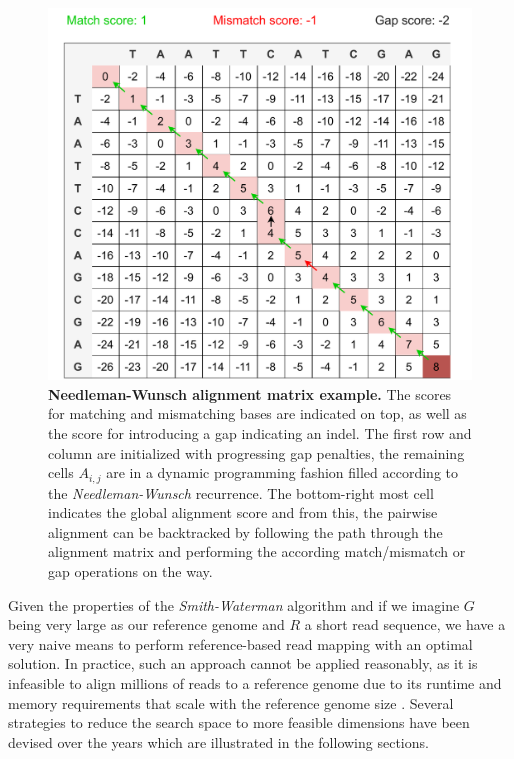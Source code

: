 \begin{figure}[h]
	 \centering
	 \includegraphics[width=0.7\linewidth]{img/chapter1/alignmentmatrix}
	  \caption[Needleman-Wunsch alignment matrix example]{\textbf{Needleman-Wunsch alignment matrix example.} The scores for matching and mismatching bases are indicated on top, as well as the score for introducing a gap indicating an indel. The first row and column are initialized with progressing gap penalties, the remaining cells $A_{i,j}$ are in a dynamic programming fashion filled according to the \textit{Needleman-Wunsch} recurrence. The bottom-right most cell indicates the global alignment score and from this, the pairwise alignment can be backtracked by following the path through the alignment matrix and performing the according match/mismatch or gap operations on the way.}
	 \label{fig:needleman_wunsch}
\end{figure}

Given the properties of the \textit{Smith-Waterman} algorithm and if we imagine $G$ being very large as our reference genome and $R$ a short read sequence, we have a very naive means to perform reference-based read mapping with an optimal solution. In practice, such an approach cannot be applied reasonably, as it is infeasible to align millions of reads to a reference genome  due to its runtime and memory requirements that scale with the reference genome size \citep{Canzar2015}. Several strategies to reduce the search space to more feasible dimensions have been devised over the years which are illustrated in the following sections.

